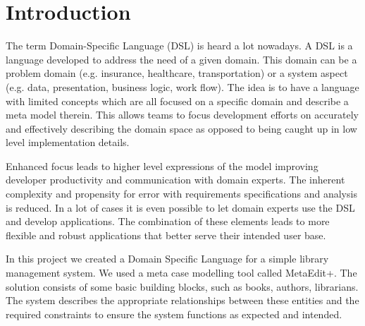 \section{Introduction}
The term Domain-Specific Language (DSL) is heard a lot nowadays. A DSL is a language developed to address the need of a given domain. This domain can be a problem domain (e.g. insurance, healthcare, transportation) or a system aspect (e.g. data, presentation, business logic, work flow).
The idea is to have a language with limited concepts which are all focused on a specific domain and describe a meta model therein. \cite{karsai2014design}
This allows teams to focus development efforts on accurately and effectively describing the domain space as opposed to being caught up in low level implementation details.\par
Enhanced focus leads to higher level expressions of the model improving developer productivity and communication with domain experts. The inherent complexity and propensity for error with requirements specifications and analysis is reduced.
In a lot of cases it is even possible to let domain experts use the DSL and develop applications. The combination of these elements leads to more flexible and robust applications that better serve their intended user base.

In this project we created a Domain Specific Language for a simple library management system. We used a meta case modelling tool called MetaEdit+.  The solution consists of some basic building blocks, such as books, authors, librarians. The system describes the appropriate relationships between these entities and the required constraints to ensure the system functions as expected and intended.